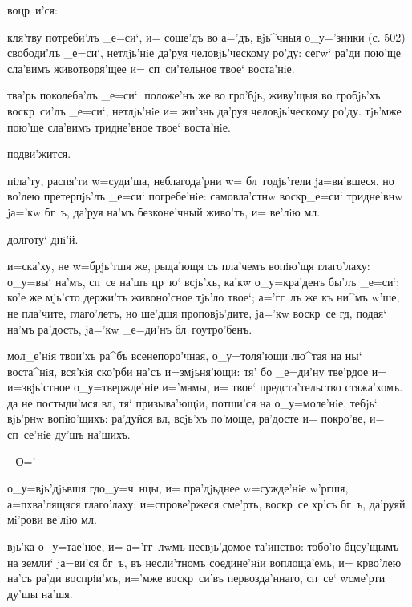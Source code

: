 воцр~и'ся: %


кля'тву потреби'лъ _е=си`, и= соше'дъ во а='дъ, вjь^чныя 
о_у='зники (с. 502) свободи'лъ _е=си`, нетлjь'нiе да'руя 
человjь'ческому ро'ду: сегw` ра'ди пою'ще сла'вимъ 
животворя'щее и= сп~си'тельное твое` воста'нiе.



тва'рь поколеба'лъ _е=си`: положе'нъ же во гро'бjь, 
живу'щыя во гробjь'хъ воскр~си'лъ _е=си`, нетлjь'нiе и= 
жи'знь да'руя человjь'ческому ро'ду. тjь'мже пою'ще 
сла'вимъ тридне'вное твое` воста'нiе.

подви'жится.

пiла'ту, распя'ти w=суди'ша, неблагода'рни w= 
бл~годjь'тели jа=ви'вшеся. но во'лею претерпjь'лъ _е=си` 
погребе'нiе: самовла'стнw воскр _е=си` тридне'внw 
jа='кw бг~ъ, да'руя на'мъ безконе'чный живо'тъ, и= ве'лiю 
мл.

долготу` днi'й.

и=ска'ху, не w=брjь'тшя же, рыда'ющя съ пла'чемъ вопiю'щя 
глаго'лаху: о_у=вы` на'мъ, сп~се на'шъ цр~ю` всjь'хъ, 
ка'кw о_у=кра'денъ бы'лъ _е=си`; ко'е же мjь'сто держи'тъ 
живоно'сное тjь'ло твое`; а='гг~лъ же къ ни^мъ 
w'ше, не пла'чите, глаго'летъ, но ше'дшя 
проповjь'дите, jа='кw воскр~се гд, подая` на'мъ 
ра'дость, jа='кw _е=ди'нъ бл~гоутро'бенъ.

мол_е'нiя твои'хъ ра^бъ всенепоро'чная, о_у=толя'ющи 
лю^тая на ны` воста^нiя, вся'кiя ско'рби на'съ 
и=змjьня'ющи: тя' бо _е=ди'ну тве'рдое и= и=звjь'стное 
о_у=твержде'нiе и='мамы, и= твое` предста'тельство 
стяжа'хомъ. да не постыди'мся вл, тя` призыва'ющiи, 
потщи'ся на о_у=моле'нiе, тебjь` вjь'рнw вопiю'щихъ: 
ра'дуйся вл, всjь'хъ по'моще, ра'досте и= покро'ве, 
и= сп~се'нiе ду'шъ на'шихъ.

_О='%


о_у=вjь'дjьвшя гд о_у=ч~нцы, и= пра'дjьднее 
w=сужде'нiе w'ргшя, а=п хва'лящяся глаго'лаху: 
и=спрове'ржеся сме'рть, воскр~се хр'съ бг~ъ, да'руяй 
мi'рови ве'лiю мл.

вjь'ка о_у=тае'ное, и= а='гг~лwмъ несвjь'домое та'инство: 
тобо'ю бц су'щымъ на земли` jа=ви'ся бг~ъ, въ 
несли'тномъ соедине'нiи воплоща'емь, и= кр во'лею 
на'съ ра'ди воспрiи'мъ, и='мже воскр~си'въ 
первозда'ннаго, сп~се` w\т сме'рти ду'шы на'шя.
